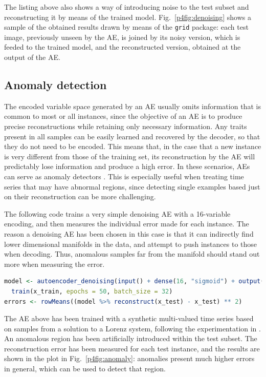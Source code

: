 The listing above also shows a way of introducing noise to the test subset and reconstructing it by means of the trained model. Fig.~\ref{p4fig:denoising} shows a sample of the obtained results drawn by means of the \texttt{grid} package: each test image, previously unseen by the AE, is joined by its noisy version, which is feeded to the trained model, and the reconstructed version, obtained at the output of the AE.


\subsection{Anomaly detection}
\label{p4sec.anomaly}

The encoded variable space generated by an AE usually omits information that is common to most or all instances, since the objective of an AE is to produce precise reconstructions while retaining only necessary information. Any traits present in all samples can be easily learned and recovered by the decoder, so that they do not need to be encoded. This means that, in the case that a new instance is very different from those of the training set, its reconstruction by the AE will predictably lose information and produce a high error. In these scenarios, AEs can serve as anomaly detectors \cite{sakurada,park}. This is especially useful when treating time series that may have abnormal regions, since detecting single examples based just on their reconstruction can be more challenging.

The following code trains a very simple denoising AE with a 16-variable encoding, and then measures the individual error made for each instance. The reason a denoising AE has been chosen in this case is that it can indirectly find lower dimensional manifolds in the data, and attempt to push instances to those when decoding. Thus, anomalous samples far from the manifold should stand out more when measuring the error.

\begin{lstlisting}[language=R]
model <- autoencoder_denoising(input() + dense(16, "sigmoid") + output()) %>% 
  train(x_train, epochs = 50, batch_size = 32)
errors <- rowMeans((model %>% reconstruct(x_test) - x_test) ** 2)
\end{lstlisting}

The AE above has been trained with a synthetic multi-valued time series based on samples from a solution to a Lorenz system, following the experimentation in \cite{sakurada}. An anomalous region has been artificially introduced within the test subset. The reconstruction error has been measured for each test instance, and the results are shown in the plot in Fig.~\ref{p4fig:anomaly}: anomalies present much higher errors in general, which can be used to detect that region.

